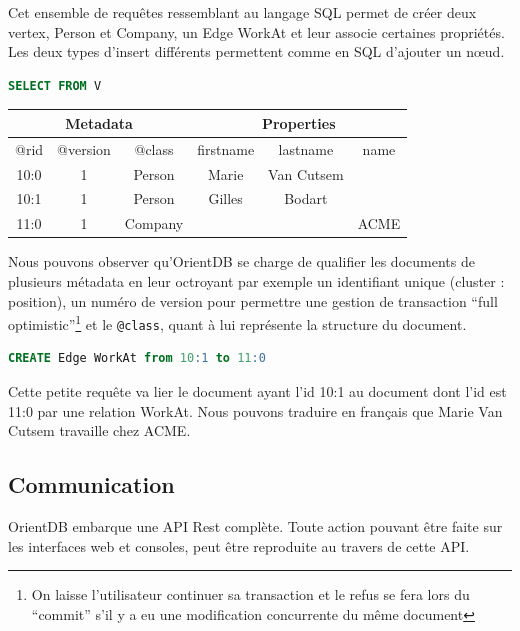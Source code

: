\documentclass[a4paper,fleqn,12pt,oneside]{report}
\begin{document}
Cet ensemble de requêtes ressemblant au langage SQL permet de créer deux vertex, Person et Company, un Edge WorkAt et leur associe certaines propriétés. Les deux types d’insert différents permettent comme en SQL d’ajouter un nœud.

\begin{lstlisting}[language=SQL]
SELECT FROM V
\end{lstlisting}
\begin{center}
	\begin{tabular}{|c|c|c|c|c|c|}
   		\hline
  		\multicolumn{3}{|c|}{Metadata} & \multicolumn{3}{c|}{Properties} \\
   		\hline
   		@rid & @version & @class & firstname & lastname & name \\
   		\hline
   		10:0 & 1 & Person & Marie & Van Cutsem &  \\
   		10:1 & 1 & Person & Gilles & Bodart &  \\
   		11:0 & 1 & Company &  &  & ACME \\
   		\hline
	\end{tabular}
\end{center}

Nous pouvons observer qu'OrientDB se charge de qualifier les documents de plusieurs métadata en leur octroyant par exemple un identifiant unique (\no cluster : position), un numéro de version pour permettre une gestion de transaction \enquote{full optimistic}\footnote{On laisse l'utilisateur continuer sa transaction et le refus se fera lors du \enquote{commit} s'il y a eu une modification concurrente du même document} et le \texttt{@class}, quant à lui représente la structure du document.

\begin{lstlisting}[language=SQL]
CREATE Edge WorkAt from 10:1 to 11:0
\end{lstlisting}

Cette petite requête va lier le document ayant l'id 10:1 au document dont l'id est 11:0 par une relation WorkAt. Nous pouvons traduire en français que Marie Van Cutsem travaille chez ACME.\cite{OrientDBGettingStarted}


\subsection{Communication}

OrientDB embarque une API Rest complète\cite{fielding2000architectural}. Toute action pouvant être faite sur les interfaces web et consoles, peut être reproduite au travers de cette API.
\end{document}
